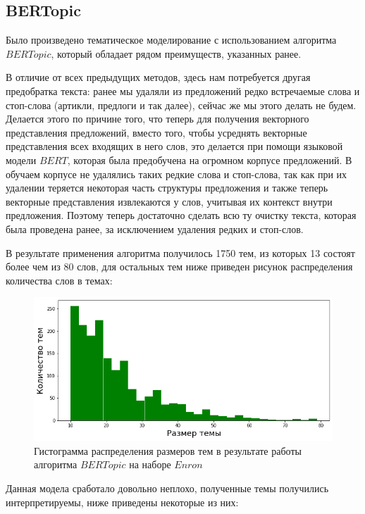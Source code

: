 \subsection{BERTopic}

Было произведено тематическое моделирование с использованием алгоритма $BERTopic$, который
обладает рядом преимуществ, указанных ранее.

В отличие от всех предыдущих методов, здесь нам потребуется другая предобратка текста: 
ранее мы удаляли из предложений редко встречаемые слова и стоп-слова (артикли, предлоги 
и так далее), сейчас же мы этого делать не будем. Делается этого по причине того, что
теперь для получения векторного представления предложений, вместо того, чтобы усреднять 
векторные представления всех входящих в него слов, это делается при помощи языковой модели 
$BERT$, которая была предобучена на огромном корпусе предложений. В обучаем корпусе не удалялись таких редкие слова и стоп-слова, так как при их удалении теряется некоторая часть
структуры предложения и также теперь векторные представления извлекаются у слов, учитывая их контекст внутри предложения. Поэтому теперь достаточно сделать всю ту очистку текста, 
которая была проведена ранее, за исключением удаления редких и стоп-слов.

В результате применения алгоритма получилось 1750 тем, из которых 13 состоят более чем
из 80 слов, для остальных тем ниже приведен рисунок распределения количества слов в темах:

\begin{figure}[H]
\centering
\includegraphics[scale=0.7]{pics/bert-size-distrib.png}
\caption{Гистограмма распределения размеров тем в результате работы алгоритма $BERTopic$
на наборе $Enron$}
\end{figure}


Данная модела сработало довольно неплохо, полученные темы получились интерпретируемы, ниже приведены некоторые из них:

